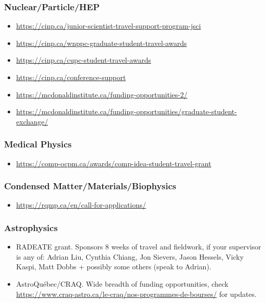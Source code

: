     \subsubsection{Nuclear/Particle/HEP}
    \begin{itemize}
        \item \url{https://cinp.ca/junior-scientist-travel-support-program-jsci}
        \item \url{https://cinp.ca/wnppc-graduate-student-travel-awards}
        \item \url{https://cinp.ca/cupc-student-travel-awards}
        \item \url{https://cinp.ca/conference-support}
        \item  \url{https://mcdonaldinstitute.ca/funding-opportunities-2/}
        \item \url{https://mcdonaldinstitute.ca/funding-opportunities/graduate-student-exchange/}
    \end{itemize} 

    \subsubsection{Medical Physics}
    \begin{itemize}
        \item \url{https://comp-ocpm.ca/awards/comp-idea-student-travel-grant}
    \end{itemize}

    \subsubsection{Condensed Matter/Materials/Biophysics}
    \begin{itemize}
        \item \url{https://rqmp.ca/en/call-for-applications/}
    \end{itemize}

    \subsubsection{Astrophysics}

    \begin{itemize}
        \item RADEATE grant. Sponsors 8 weeks of travel and fieldwork, if your supervisor is any of: Adrian Liu, Cynthia Chiang, Jon Sievers, Jason Hessels, Vicky Kaspi, Matt Dobbs + possibly some others (speak to Adrian).
        \item AstroQuébec/CRAQ. Wide breadth of funding opportunities, check \url{https://www.craq-astro.ca/le-craq/nos-programmes-de-bourses/} for updates.
    \end{itemize}


